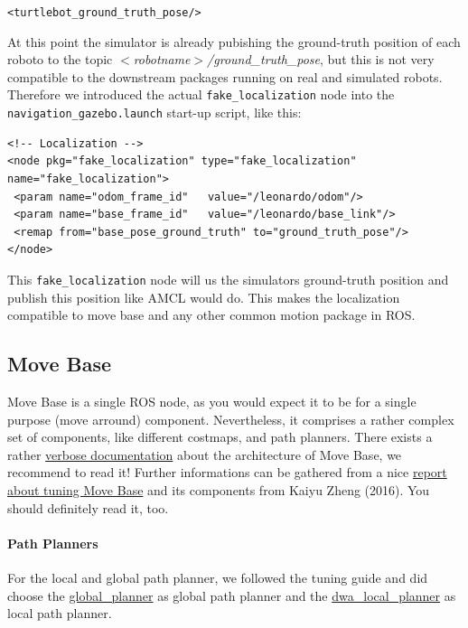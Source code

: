 \verb$<turtlebot_ground_truth_pose/>$

At this point the simulator is already pubishing the ground-truth position of each roboto to the topic \emph{$<$robotname$>$/ground\_truth\_pose}, but this is not very compatible to the downstream packages running on real and simulated robots. Therefore we introduced the actual \verb$fake_localization$ node into the \verb$navigation_gazebo.launch$ start-up script, like this:

\begin{Verbatim}[fontsize=\scriptsize]
<!-- Localization -->
<node pkg="fake_localization" type="fake_localization" name="fake_localization">
 <param name="odom_frame_id"   value="/leonardo/odom"/>
 <param name="base_frame_id"   value="/leonardo/base_link"/>
 <remap from="base_pose_ground_truth" to="ground_truth_pose"/>
</node>
\end{Verbatim}

This \verb$fake_localization$ node will us the simulators ground-truth position and publish this position like AMCL would do. This makes the localization compatible to move base and any other common motion package in ROS. 

\subsection{Move Base}
\label{ssec:MoveBase}

Move Base is a single ROS node, as you would expect it to be for a single purpose (move arround) component. Nevertheless, it comprises a rather complex set of components, like different costmaps, and path planners. There exists a rather \href{http://wiki.ros.org/move_base}{verbose documentation} about the architecture of Move Base, we recommend to read it! Further informations can be gathered from a nice \href{http://kaiyuzheng.me/documents/navguide.pdf}{report about tuning Move Base} and its components from Kaiyu Zheng (2016). You should definitely read it, too.

\paragraph{Path Planners}

For the local and global path planner, we followed the tuning guide and did choose the \href{http://wiki.ros.org/global_planner}{global\_planner} as global path planner and the \href{http://wiki.ros.org/dwa_local_planner}{dwa\_local\_planner} as local path planner. 

